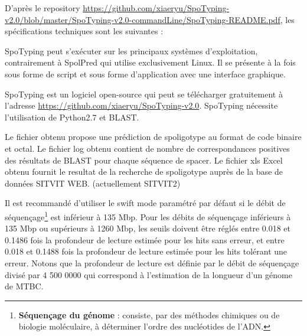 \documentclass[twoside,a4paper,11pt,frenchb,openany]{report}
\begin{document}
D'après le repository \url{https://github.com/xiaeryu/SpoTyping-v2.0/blob/master/SpoTyping-v2.0-commandLine/SpoTyping-README.pdf}, les spécifications techniques sont les suivantes :

SpoTyping peut s'exécuter sur les principaux systèmes d'exploitation, contrairement à SpolPred qui utilise exclusivement Linux. Il se présente à la fois sous forme de script et sous forme d'application avec une interface graphique.

SpoTyping est un logiciel open-source qui peut se télécharger gratuitement à l'adresse \url{https://github.com/xiaeryu/SpoTyping-v2.0}. SpoTyping nécessite l'utilisation de Python2.7 et BLAST.

Le fichier obtenu propose une prédiction de spoligotype au format de code binaire et octal. Le fichier log obtenu contient de nombre de correspondances positives des résultats de BLAST pour chaque séquence de spacer. Le fichier xls Excel obtenu fournit le resultat de la recherche de spoligotype auprès de la base de données SITVIT WEB. (actuellement SITVIT2)

Il est recommandé d'utiliser le swift mode paramétré par défaut si le débit de séquençage\footnote{\textbf{Séquençage du génome} : consiste, par des méthodes chimiques ou de biologie moléculaire, à déterminer l'ordre des nucléotides de l'ADN.} est inférieur à 135 Mbp. Pour les débits de séquençage inférieurs à 135 Mbp ou supérieurs à 1260 Mbp, les seuils doivent être réglés entre 0.018 et 0.1486 fois la profondeur de lecture estimée pour les hits sans erreur, et entre 0.018 et 0.1488 fois la profondeur de lecture estimée pour les hits tolérant une erreur. Notons que la profondeur de lecture est définie par le débit de séquençage divisé par 4 500 0000 qui correspond à l'estimation de la longueur d'un génome de MTBC.


\end{document}
